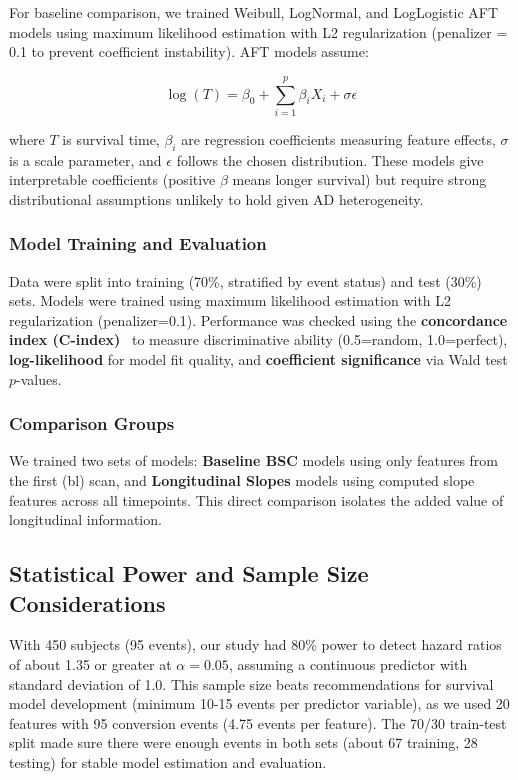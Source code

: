 \documentclass[blue]{ludusofficial}  %
\begin{document}
For baseline comparison, we trained Weibull, LogNormal, and LogLogistic AFT models using maximum likelihood estimation with L2 regularization (penalizer = 0.1 to prevent coefficient instability). AFT models assume:

\begin{equation}
    \log(T) = \beta_0 + \sum_{i=1}^{p} \beta_i X_i + \sigma \epsilon
\end{equation}

where $T$ is survival time, $\beta_i$ are regression coefficients measuring feature effects, $\sigma$ is a scale parameter, and $\epsilon$ follows the chosen distribution. These models give interpretable coefficients (positive $\beta$ means longer survival) but require strong distributional assumptions unlikely to hold given AD heterogeneity.

\subsubsection{Model Training and Evaluation}

Data were split into training (70\%, stratified by event status) and test (30\%) sets. Models were trained using maximum likelihood estimation with L2 regularization (penalizer=0.1). Performance was checked using the \textbf{concordance index (C-index)}~\cite{uno2011cstat} to measure discriminative ability (0.5=random, 1.0=perfect), \textbf{log-likelihood} for model fit quality, and \textbf{coefficient significance} via Wald test $p$-values.

\subsubsection{Comparison Groups}

We trained two sets of models: \textbf{Baseline BSC} models using only features from the first (bl) scan, and \textbf{Longitudinal Slopes} models using computed slope features across all timepoints. This direct comparison isolates the added value of longitudinal information.

\subsection{Statistical Power and Sample Size Considerations}

With 450 subjects (95 events), our study had 80\% power to detect hazard ratios of about 1.35 or greater at $\alpha=0.05$, assuming a continuous predictor with standard deviation of 1.0. This sample size beats recommendations for survival model development (minimum 10-15 events per predictor variable), as we used 20 features with 95 conversion events (4.75 events per feature). The 70/30 train-test split made sure there were enough events in both sets (about 67 training, 28 testing) for stable model estimation and evaluation.
\end{document}
